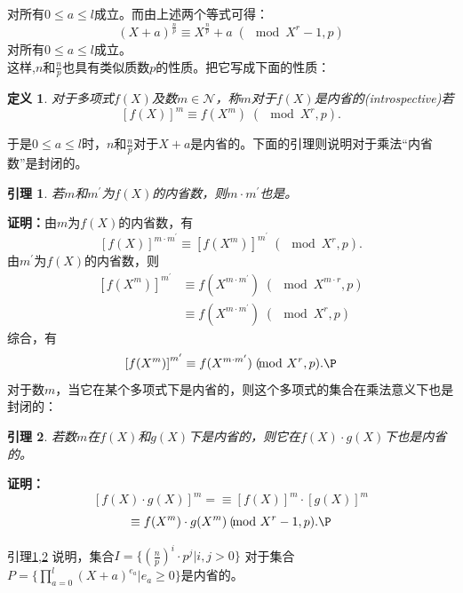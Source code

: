 \documentclass[a4paper,notitlepage]{article}
\newtheorem{lemma}{引理}[section]
\newtheorem{definition}{定义}[section]
\numberwithin{equation}{section}
\begin{document}
\begin{multicols}{2}
\begin{equation}
  \end{equation}
  对所有$0\le a\le \mathit{l}$成立。而由上述两个等式可得：
  \begin{equation}
    (X+a)^{\frac{n}{p}}\equiv X^{\frac{n}{p}}+a\;(\!\!\!\!\!\mod{X^r-1,p})
  \end{equation}
  对所有$0\le a\le \mathit{l}$成立。\\
  这样,$n$和$\frac{n}{p}$也具有类似质数$p$的性质。把它写成下面的性质：
  \begin{definition}
    \upshape 对于多项式$f(X)$及数$m\in\mathcal{N}$，称$m$对于$f(X)$是内省的(introspective)若
    \[\left[f(X)\right]^m\equiv f(X^m)\;(\!\!\!\!\!\mod{X^r,p}).\]
  \end{definition}
  于是$0\le a\le \mathit{l}$时，$n$和$\frac{n}{p}$对于$X+a$是内省的。下面的引理则说明对于乘法``内省数''是封闭的。
  \begin{lemma}\label{introspectiveN}
    \upshape 若$m$和$m^\prime$为$f(X)$的内省数，则$m\cdot m^\prime$也是。
  \end{lemma}
  \textbf{证明：}由$m$为$f(X)$的内省数，有
  \begin{equation}
    \left[f(X)\right]^{m\cdot m^\prime}\equiv\left[f(X^m)\right]^{m^\prime}\;(\!\!\!\!\!\mod{X^r,p}).
  \end{equation}
  由$m^\prime$为$f(X)$的内省数，则
  \begin{equation}
    \begin{split}
      \left[f(X^m)\right]^{m^\prime}&\equiv  f(X^{m\cdot m^\prime})\;(\!\!\!\!\!\mod{X^{m\cdot r},p})\\
      & \equiv f(X^{m\cdot m^\prime})\; (\!\!\!\!\!\mod{X^r,p})
    \end{split}
  \end{equation}
  综合，有
  \begin{equation}
    \left[f(X^m)\right]^{m^\prime}\equiv f(X^{m\cdot m^\prime})\;
    (\!\!\!\!\!\mod{X^r,p}).\P
  \end{equation}
  对于数$m$，当它在某个多项式下是内省的，则这个多项式的集合在乘法意义下也是封闭的：
  \begin{lemma}\label{introspectiveP}
    \upshape 若数$m$在$f(X)$和$g(X)$下是内省的，则它在$f(X)\cdot g(X)$下也是内省的。
  \end{lemma}
  \textbf{证明：}\[\left[f(X)\cdot g(X)\right]^m=\equiv\left[f(X)\right]^m\cdot\left[g(X)\right]^m\]
  \[\equiv f(X^m)\cdot g(X^m)\:(\!\!\!\!\!\mod{X^r-1,p}).\P\]

  引理\ref{introspectiveN},\ref{introspectiveP} 说明，集合$I=\{\left(\frac{n}{p}\right)^i\cdot p^j|i,j>0\}$
  对于集合$P=\{\prod_{a=0}^\mathit{l}\left(X+a\right)^{e_a}|e_a\ge 0\}$是内省的。\\[0.2cm]


\end{multicols}
\end{document}
